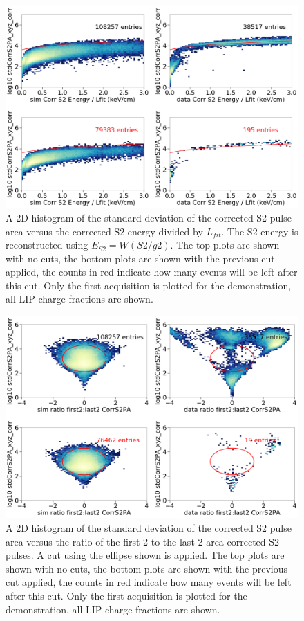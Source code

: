 \begin{figure}[htbp]
\begin{center}
\includegraphics[width=\textwidth]{figures/lips/cut3.png}
\caption{ A 2D histogram of the standard deviation of the corrected S2 pulse area versus the corrected S2 energy divided by $L_{fit}$. The S2 energy is reconstructed using $E_{S2} = W(S2/g2)$. The top plots are shown with no cuts, the bottom plots are shown with the previous cut applied, the counts in red indicate how many events will be left after this cut. Only the first acquisition is plotted for the demonstration, all \acs{LIP} charge fractions are shown.  }
\label{fig:cut3}
\end{center}
\end{figure}

\begin{figure}[htbp]
\begin{center}
\includegraphics[width=\textwidth]{figures/lips/cut4.png}
\caption{ A 2D histogram of the standard deviation of the corrected S2 pulse area versus the ratio of the first 2 to the last 2 area corrected S2 pulses. A cut using the ellipse shown is applied. The top plots are shown with no cuts, the bottom plots are shown with the previous cut applied, the counts in red indicate how many events will be left after this cut. Only the first acquisition is plotted for the demonstration, all \acs{LIP} charge fractions are shown. }
\label{fig:cut4}
\end{center}
\end{figure}

